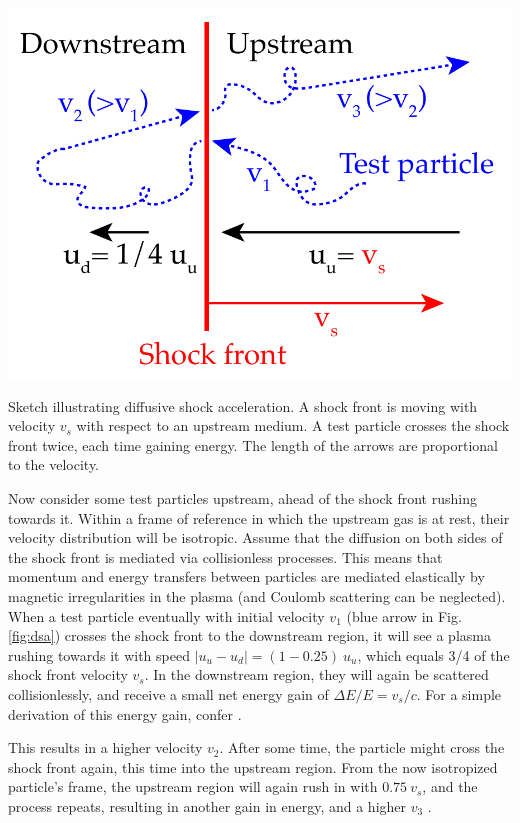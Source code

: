 \documentclass[
    a4paper, %
    fontsize=10pt, %
    twoside=false, %
    numbers=noenddot, %
    fontmethod=tex,
]{kaobook}
\begin{document}
\begin{marginfigure}
    \includegraphics{theory/dsa.pdf}
    \caption[Diffusive shock acceleration]{Sketch illustrating diffusive shock acceleration. A shock front is moving with velocity $v_s$ with respect to an upstream medium. A test particle crosses the shock front twice, each time gaining energy. The length of the arrows are proportional to the velocity.}
\end{marginfigure}

Now consider some test particles upstream, ahead of the shock front rushing towards it. Within a frame of reference in which the upstream gas is at rest, their velocity distribution will be isotropic. Assume that the diffusion on both sides of the shock front is mediated via collisionless processes. This means that momentum and energy transfers between particles are mediated elastically by magnetic irregularities in the plasma (and Coulomb scattering can be neglected). When a test particle eventually with initial velocity $v_1$ (blue arrow in Fig. \ref{fig:dsa}) crosses the shock front to the downstream region, it will see a plasma rushing towards it with speed $|u_u-u_d| = (1-0.25)~u_u$, which equals 3/4 of the shock front velocity $v_s$. In the downstream region, they will again be scattered collisionlessly, and receive a small net energy gain of $\Delta E/E = v_s/c$. For a simple derivation of this energy gain, confer \cite{Longair2011}.

This results in a higher velocity $v_2$. After some time, the particle might cross the shock front again, this time into the upstream region. From the now isotropized particle's frame, the upstream region will again rush in with $0.75~v_s$, and the process repeats, resulting in another gain in energy, and a higher $v_3$ .
\end{document}
